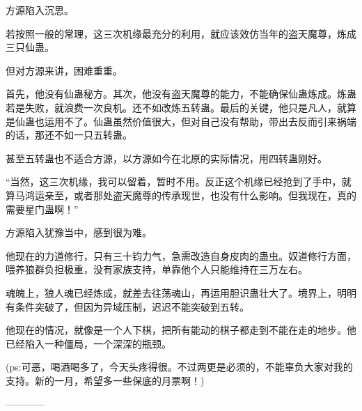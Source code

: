 \begin{this_body}
方源陷入沉思。

若按照一般的常理，这三次机缘最充分的利用，就应该效仿当年的盗天魔尊，炼成三只仙蛊。

但对方源来讲，困难重重。

首先，他没有仙蛊秘方。其次，他没有盗天魔尊的能力，不能确保仙蛊炼成。炼蛊若是失败，就浪费一次良机。还不如改炼五转蛊。最后的关键，他只是凡人，就算是仙蛊也运用不了。仙蛊虽然价值很大，但对自己没有帮助，带出去反而引来祸端的话，那还不如一只五转蛊。

甚至五转蛊也不适合方源，以方源如今在北原的实际情况，用四转蛊刚好。

“当然，这三次机缘，我可以留着，暂时不用。反正这个机缘已经抢到了手中，就算马鸿运亲至，或者那处盗天魔尊的传承现世，也没有什么影响。但我现在，真的需要星门蛊啊！”

方源陷入犹豫当中，感到很为难。

他现在的力道修行，只有三十钧力气，急需改造自身皮肉的蛊虫。奴道修行方面，喂养狼群负担极重，没有家族支持，单靠他个人只能维持在三万左右。

魂魄上，狼人魂已经炼成，就差去往荡魂山，再运用胆识蛊壮大了。境界上，明明有条件突破了，但因为异域压制，迟迟不能突破到五转。

他现在的情况，就像是一个人下棋，把所有能动的棋子都走到不能在走的地步。他已经陷入一种僵局，一个深深的瓶颈。

(ps:可恶，喝酒喝多了，今天头疼得很。不过两更是必须的，不能辜负大家对我的支持。新的一月，希望多一些保底的月票啊！)

------------

\end{this_body}

